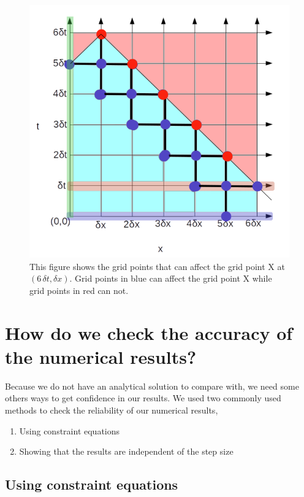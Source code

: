 \begin{figure}[hbt!]
    \centering
    \includegraphics[width=\textwidth]{images/grid_outer_boundary_condition.png}
    \caption{This figure shows the grid points that can affect the grid point X at $(6 \,\delta t, \delta x)$. Grid points in blue can affect the grid point X while grid points in red can not.}
    \label{fig:grid_outer_boundary_conditions}
\end{figure}


\section{How do we check the accuracy of the numerical results?}

Because we do not have an analytical solution to compare with, we need some others ways to get confidence in our results. We used two commonly used methods to check the reliability of our numerical results,

\begin{enumerate}
    \item Using constraint equations
    \item Showing that the results are independent of the step size
\end{enumerate}

\subsection{Using constraint equations}

